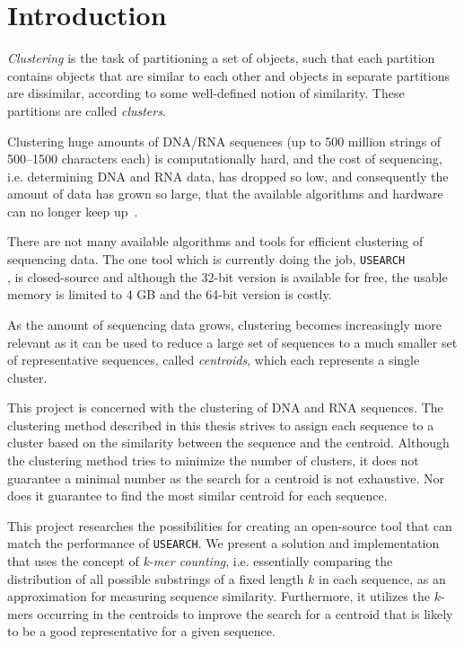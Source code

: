 \section{Introduction}
\label{sec:introduction}

\emph{Clustering} is the task of partitioning a set of objects, such that each
partition contains objects that are similar to each other and objects in
separate partitions are dissimilar, according to some well-defined notion of
similarity. These partitions are called \emph{clusters}.

Clustering huge amounts of DNA/RNA sequences (up to \num{500} million strings of
\num{500}--\num{1500} characters each) is computationally hard, and the cost of sequencing,
i.e. determining DNA and RNA data, has dropped so low, and consequently the
amount of data has grown so large, that the available algorithms and hardware
can no longer keep up~\cite{rothberg}.

There are not many available algorithms and tools for efficient clustering of
sequencing data. The one tool which is currently doing the job,
\texttt{USEARCH} \\ 
\cite{edgar,usearch}, is closed-source and although the \num{32}-bit
version is available for free, the usable memory is limited to \num{4} GB and the
\num{64}-bit version is costly.

As the amount of sequencing data grows, clustering becomes increasingly more
relevant as it can be used to reduce a large set of sequences to a much smaller
set of representative sequences, called \emph{centroids}, which each represents
a single cluster.

This project is concerned with the clustering of DNA and RNA sequences. The
clustering method described in this thesis strives to assign each sequence to
a cluster based on the similarity between the sequence and the centroid.
Although the clustering method tries to minimize the number of clusters, it
does not guarantee a minimal number as the search for a centroid is not
exhaustive. Nor does it guarantee to find the most similar centroid for each
sequence.

This project researches the possibilities for creating an open-source tool that
can match the performance of \texttt{USEARCH}. We present a solution and
implementation that uses the concept of \emph{k-mer counting}, i.e. essentially
comparing the distribution of all possible substrings of a fixed length $k$ in
each sequence, as an approximation for measuring sequence similarity.
Furthermore, it utilizes the $k$-mers occurring in the centroids to improve
the search for a centroid that is likely to be a good representative for a
given sequence.

